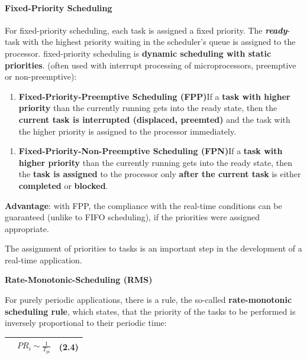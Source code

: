 \paragraph{ Fixed-Priority Scheduling}

For fixed-priority scheduling, each task is assigned a fixed priority. The \textbf{\textit{ready}}-task with the highest priority waiting in the scheduler's queue is assigned to the processor.  fixed-priority scheduling is\textbf{ dynamic scheduling with static priorities}. (often used with interrupt processing of microprocessors, preemptive or non-preemptive):

\begin{enumerate}
	\item  \textbf{Fixed-Priority-Preemptive Scheduling (FPP)}If a \textbf{task with higher priority} than the currently running gets into the ready state, then the \textbf{current task is interrupted (displaced, preemted)} and the task with the higher priority is assigned to the processor immediately.
\end{enumerate}

\begin{enumerate}
	\item  \textbf{Fixed-Priority-Non-Preemptive Scheduling (FPN)}If a \textbf{task with higher priority} than the currently running gets into the ready state, then the \textbf{task is assigned} to the processor only \textbf{after the current task} is either \textbf{completed} or \textbf{blocked}.
\end{enumerate}


\textbf{Advantage}: with FPP, the compliance with the real-time conditions can be guaranteed (unlike to FIFO scheduling), if the priorities were assigned appropriate. 

The assignment of priorities to tasks is an important step in the development of a real-time application.

\textbf{Rate-Monotonic-Scheduling (RMS)}

For purely periodic applications, there is a rule, the so-called \textbf{rate-monotonic scheduling rule}, which states, that the priority of the tasks to be performed is inversely proportional to their periodic time:

\begin{tabular}{|p{0.3in}|p{3.9in}|p{0.4in}|} \hline 
 &       $PR_{i} \sim \frac{1}{T_{pi} } $ & (2.4) \\ \hline 
\end{tabular}

